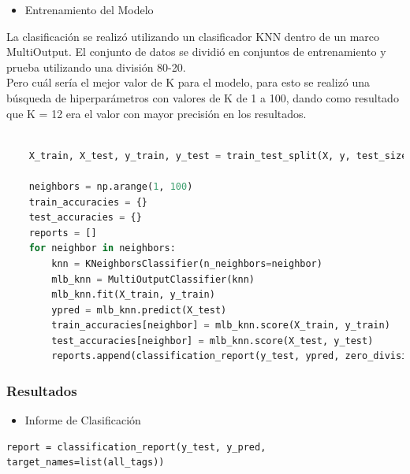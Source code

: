 \documentclass{article}
\begin{document}
\begin{itemize}
    \item Entrenamiento del Modelo
\end{itemize}
La clasificación se realizó utilizando un clasificador KNN dentro de un marco MultiOutput. El conjunto de datos se dividió en conjuntos de entrenamiento y prueba utilizando una división 80-20.\\ 
Pero cuál sería el mejor valor de K para el modelo, para esto se realizó una búsqueda de hiperparámetros con valores de K de 1 a 100, dando como resultado que K = 12 era el valor con mayor precisión en los resultados.

\begin{lstlisting}[language=Python, caption=KNN]
    
    X_train, X_test, y_train, y_test = train_test_split(X, y, test_size=0.2, random_state=42)
    
    neighbors = np.arange(1, 100)
    train_accuracies = {}
    test_accuracies = {}
    reports = []
    for neighbor in neighbors:
        knn = KNeighborsClassifier(n_neighbors=neighbor)
        mlb_knn = MultiOutputClassifier(knn)
        mlb_knn.fit(X_train, y_train)
        ypred = mlb_knn.predict(X_test) 
        train_accuracies[neighbor] = mlb_knn.score(X_train, y_train)
        test_accuracies[neighbor] = mlb_knn.score(X_test, y_test)
        reports.append(classification_report(y_test, ypred, zero_division = 0))
    \end{lstlisting}

\subsubsection{Resultados}
\begin{itemize}
    \item Informe de Clasificación
\end{itemize}

\begin{verbatim}
report = classification_report(y_test, y_pred, target_names=list(all_tags))
\end{verbatim}
\end{document}
